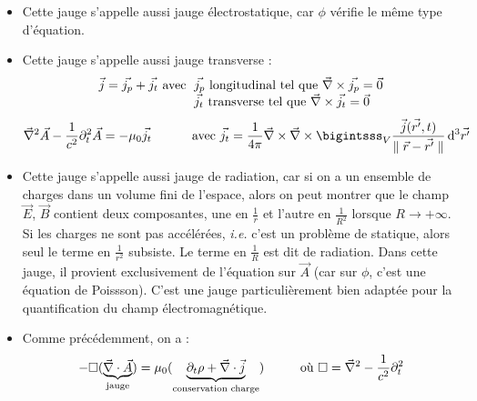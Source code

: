 	
	\begin{remarks}\hspace{1pt}
		\begin{itemize}
			\item Cette jauge s'appelle aussi jauge électrostatique, car $\phi$ vérifie le même type d'équation.
			\item Cette jauge s'appelle aussi jauge transverse :
$$
	\begin{array}{r@{\;}l}
					\vec{j}=\vec{j_p}+\vec{j_t} \text{ avec }&\vec{j_p} \text{ longitudinal tel que } \nab\times\vec{j_p}=\vec{0}\\
					&\vec{j_t} \text{ transverse tel que } \nab\times\vec{j_t}=\vec{0}
	\end{array}
$$
$$
			\nab^2\vec{A}-\frac{1}{c^2}\partial_t^2\vec{A}=-\mu_0\vec{j_t}\\
			\text{\hspace{1cm} avec }\vec{j_t}=\frac{1}{4\pi}\nab\times\nab\times\bigintsss_V\frac{\vec{j}(\vec{r'},t)}{\parallel\vec{r}-\vec{r'}\parallel}\,\dif^3\vec{r'}
$$
			\item {\txt Cette jauge s'appelle aussi jauge de radiation, car si on a un ensemble de charges dans un volume fini de l'espace, alors on peut montrer que le champ $\vec{E}$, $\vec{B}$ contient deux composantes, une en $\frac{1}{r}$ et l'autre en $\frac{1}{R^2}$ lorsque $R\rightarrow+\infty$. Si les charges ne sont pas accélérées, \emph{i.e.} c'est un problème de statique, alors seul le terme en $\frac{1}{r^2}$ subsiste. Le terme en $\frac{1}{R}$ est dit de radiation. Dans cette jauge, il provient exclusivement de l'équation sur $\vec{A}$ (car sur $\phi$, c'est une équation de Poissson). C'est une jauge particulièrement bien adaptée pour la quantification du champ électromagnétique.}
			\item Comme précédemment, on a :
$$
	-\square(\underbrace{\vec{\nabla}\cdot\vec{A}}_{\text{jauge}})=\mu_0(\underbrace{\partial_t\rho+\vec{\nabla}\cdot\vec{j}}_{\text{conservation  charge}})\text{\hspace{1cm}où }\square=\vec{\nabla}^2-\frac{1}{c^2}\partial_t^2
$$
		\end{itemize}
	\end{remarks}